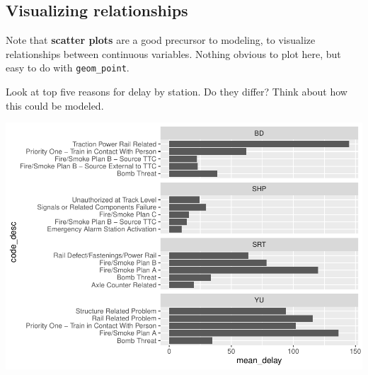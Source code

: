 \documentclass[
]{book}
\newenvironment{Shaded}{\begin{snugshade}}{\end{snugshade}}
\newcommand{\DataTypeTok}[1]{\textcolor[rgb]{0.13,0.29,0.53}{#1}}
\newcommand{\DecValTok}[1]{\textcolor[rgb]{0.00,0.00,0.81}{#1}}
\newcommand{\KeywordTok}[1]{\textcolor[rgb]{0.13,0.29,0.53}{\textbf{#1}}}
\newcommand{\NormalTok}[1]{#1}
\newcommand{\OperatorTok}[1]{\textcolor[rgb]{0.81,0.36,0.00}{\textbf{#1}}}
\newcommand{\StringTok}[1]{\textcolor[rgb]{0.31,0.60,0.02}{#1}}
\begin{document}
\hypertarget{visualizing-relationships}{%
\subsection{Visualizing relationships}\label{visualizing-relationships}}

Note that \textbf{scatter plots} are a good precursor to modeling, to visualize relationships between continuous variables. Nothing obvious to plot here, but easy to do with \texttt{geom\_point}.

Look at top five reasons for delay by station. Do they differ? Think about how this could be modeled.

\begin{Shaded}
\end{Shaded}

\includegraphics{telling_stories_with_data_files/figure-latex/unnamed-chunk-267-1.pdf}
\end{document}

